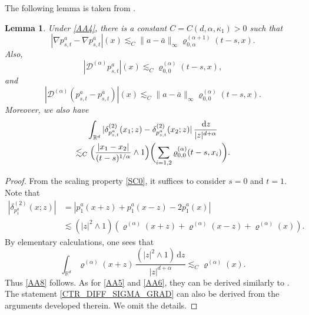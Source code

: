\documentclass[JEP,XML,SOM,Unicode,published]{cedram}
\theoremstyle{plain}
\newtheorem{lemma}[theorem]{Lemma}
\theoremstyle{definition}
\newcommand\cD{{\mathcal D}}
\newcommand\mR{\mathbb{R}}
\newcommand\1{{\mathbf{1}}}
\newcommand{\dif}{\,\mathrm{d}}
\begin{document}
The following lemma is taken from \cite[Lem.\,3.2 \& 3.3]{Ch-Zh1}.
\begin{lemma} \label{Le210}
Under \eqref{AA4}, there is a constant $C=C(d,\alpha,\kappa_1)>0$ such that
\begin{equation}\label{CTR_DIFF_SIGMA_GRAD}
|\nabla p_{s,t}^a-\nabla p_{s,t}^{\bar a}|(x)\lesssim_C \|a-\bar a\|_\infty\varrho^{(\alpha+1)}_{0,\alpha}(t-s, x).
\end{equation}
Also,
\begin{equation}\label{AA8}
|\cD^{(\alpha)}p_{s,t}^a|(x)\lesssim_C\varrho^{(\alpha)}_{0,0}(t-s, x),
\end{equation}
and
\begin{equation}\label{AA5}
|\cD^{(\alpha)}(p_{s,t}^a-p_{s,t}^{\bar a})|(x)\lesssim_C\|a-\bar a\|_\infty\varrho^{(\alpha)}_{0,0}(t-s, x).
\end{equation}
Moreover, we also have
\begin{multline}\label{AA6}
\int_{\mR^d}|\delta^{(2)}_{p_{s,t}^a}(x_1;z)-\delta^{(2)}_{p_{s,t}^a}(x_2;z)|\,\frac{\dif z}{|z|^{d+\alpha}}
\\\lesssim_C\Bigl(\frac{|x_1-x_2|}{(t-s)^{1/\alpha}}\wedge 1\Bigr)\biggl(\sum_{i=1,2}\varrho^{(\alpha)}_{0,0}(t-s, x_i)\biggr).
\end{multline}
\end{lemma}
\begin{proof}
From the scaling property \eqref{SC0}, it suffices to consider $s=0$ and $t=1$. Note that
\begin{align*}
|\delta^{(2)}_{p_1^a}(x;z)|&=|p_1^a(x+z)+p_1^a(x-z)-2p_1^a(x)|\\
&\lesssim(|z|^2\wedge 1)(\varrho^{(\alpha)}(x+z)+\varrho^{(\alpha)}(x-z)+\varrho^{(\alpha)}(x)).
\end{align*}
By elementary calculations, one sees that
\begin{equation}\label{AA86}
\int_{\mR^d}\varrho^{(\alpha)}(x+z)\,\frac{(|z|^2\wedge 1)\dif z}{|z|^{d+\alpha}}\lesssim_C\varrho^{(\alpha)}(x).
\end{equation}
Thus \eqref{AA8} follows. As for \eqref{AA5} and \eqref{AA6}, they can be derived similarly
to \hbox{\cite[Lem.\,2.7 \& 2.8]{Ch-Zh20}}. The statement \eqref{CTR_DIFF_SIGMA_GRAD} can also be derived
from the arguments developed therein.
We omit the details.
\end{proof}
\end{document}
